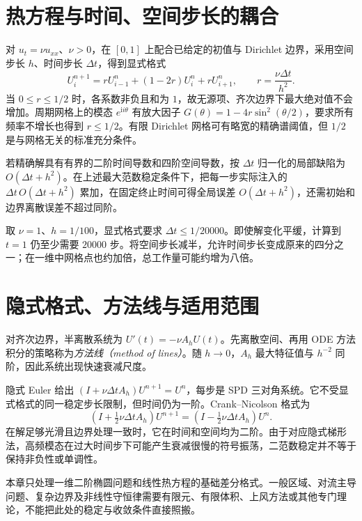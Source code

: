 \documentclass[UTF8,12pt,a4paper,fontset=fandol]{ctexbook}
\begin{document}
\section{热方程与时间、空间步长的耦合}
对 $u_t=\nu u_{xx}$、$\nu>0$，在 $[0,1]$ 上配合已给定的初值与 Dirichlet 边界，采用空间步长 $h$、时间步长 $\Delta t$，得到显式格式
\begin{equation}
 U_i^{n+1}=rU_{i-1}^n+(1-2r)U_i^n+rU_{i+1}^n,
 \qquad r=\frac{\nu\Delta t}{h^2}.
 \label{eq:na-heat-explicit}
\end{equation}
当 $0\le r\le1/2$ 时，各系数非负且和为 $1$，故无源项、齐次边界下最大绝对值不会增加。周期网格上的模态 $e^{\mathrm i i\theta}$ 有放大因子 $G(\theta)=1-4r\sin^2(\theta/2)$，要求所有频率不增长也得到 $r\le1/2$。有限 Dirichlet 网格可有略宽的精确谱阈值，但 $1/2$ 是与网格无关的标准充分条件。

若精确解具有有界的二阶时间导数和四阶空间导数，按 $\Delta t$ 归一化的局部缺陷为 $O(\Delta t+h^2)$。在上述最大范数稳定条件下，把每一步实际注入的 $\Delta t\,O(\Delta t+h^2)$ 累加，在固定终止时间可得全局误差 $O(\Delta t+h^2)$，还需初始和边界离散误差不超过同阶。

\begin{example}[稳定约束的实际代价]
取 $\nu=1$、$h=1/100$，显式格式要求 $\Delta t\le1/20000$。即使解变化平缓，计算到 $t=1$ 仍至少需要 $20000$ 步。将空间步长减半，允许时间步长变成原来的四分之一；在一维中网格点也约加倍，总工作量可能约增为八倍。
\end{example}

\section{隐式格式、方法线与适用范围}
对齐次边界，半离散系统为 $U'(t)=-\nu A_hU(t)$。先离散空间、再用 ODE 方法积分的策略称为\emph{方法线（method of lines）}。随 $h\to0$，$A_h$ 最大特征值与 $h^{-2}$ 同阶，因此系统出现快速衰减尺度。

隐式 Euler 给出 $(I+\nu\Delta t A_h)U^{n+1}=U^n$，每步是 SPD 三对角系统。它不受显式格式的同一稳定步长限制，但时间仍为一阶。Crank--Nicolson 格式为
\[
 (I+\tfrac12\nu\Delta t A_h)U^{n+1}
 =(I-\tfrac12\nu\Delta t A_h)U^n.
\]
在解足够光滑且边界处理一致时，它在时间和空间均为二阶。由于对应隐式梯形法，高频模态在过大时间步下可能产生衰减很慢的符号振荡，二范数稳定并不等于保持非负性或单调性。

本章只处理一维二阶椭圆问题和线性热方程的基础差分格式。一般区域、对流主导问题、复杂边界及非线性守恒律需要有限元、有限体积、上风方法或其他专门理论，不能把此处的稳定与收敛条件直接照搬。
\end{document}
